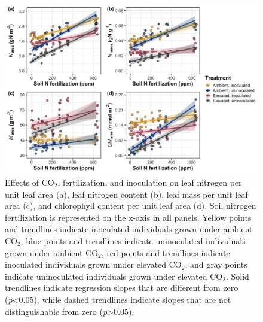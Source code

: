 \newpage
    \begin{figure}
        \centering
        \includegraphics[width=\columnwidth]{ch5_NxCO2xI/figs/NxCO2xI_fig1_leafN.jpg}
        \caption[Effects of CO$_2$, fertilization, and inoculation on leaf nitrogen per unit leaf area, leaf nitrogen content, leaf mass per unit leaf area, and chlorophyll content per unit leaf area]{Effects of CO$_2$, fertilization, and inoculation on leaf nitrogen per unit leaf area (a), leaf nitrogen content (b), leaf mass per unit leaf area (c), and chlorophyll content per unit leaf area (d). Soil nitrogen fertilization is represented on the x-axis in all panels. Yellow points and trendlines indicate inoculated individuals grown under ambient CO$_2$, blue points and trendlines indicate uninoculated individuals grown under ambient CO$_2$, red points and trendlines indicate inoculated individuals grown under elevated CO$_2$, and gray points indicate uninoculated individuals grown under elevated CO$_2$. Solid trendlines indicate regression slopes that are different from zero (\textit{p}<0.05), while dashed trendlines indicate slopes that are not distinguishable from zero (\textit{p}>0.05).}
        \label{fig:figure5.1}
    \end{figure}
\clearpage


